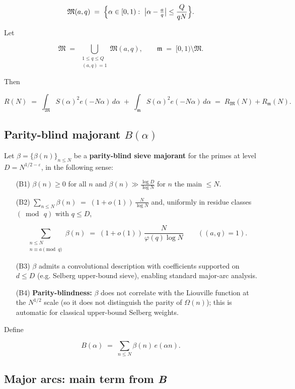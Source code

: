 \documentclass[11pt]{article}
\theoremstyle{definition}
\theoremstyle{remark}
\numberwithin{equation}{part}
\begin{document}
$$
	\mathfrak M(a,q)\;=\;\Bigl\{\alpha\in[0,1):\ \bigl|\alpha-\tfrac{a}{q}\bigr|
	\le \frac{Q}{qN}\Bigr\}.
$$

Let

$$
	\mathfrak M\;=\;\bigcup_{\substack{1\le q\le Q\\ (a,q)=1}}\mathfrak M(a,q),
	\qquad
	\mathfrak m\;=\;[0,1)\setminus\mathfrak M .
$$

Then

$$
	R(N)\;=\;\int_{\mathfrak M} S(\alpha)^2 e(-N\alpha)\,d\alpha\;+\;
	\int_{\mathfrak m} S(\alpha)^2 e(-N\alpha)\,d\alpha
	\;=\;R_{\mathfrak M}(N)+R_{\mathfrak m}(N).
$$


\subsection{Parity-blind majorant \texorpdfstring{$B(\alpha)$}{B\textalpha}}

Let $\beta=\{\beta(n)\}_{n\le N}$ be a \textbf{parity-blind sieve majorant} for the primes at level $D=N^{1/2-\varepsilon}$, in the following sense:

\begin{itemize}[leftmargin=*]
	\item[(B1)] $\beta(n)\ge 0$ for all $n$ and $\beta(n)\gg \tfrac{\log D}{\log N}$ for $n$ the main $\le N$.
	\item[(B2)] $\displaystyle \sum_{n\le N}\beta(n)\;=\;(1+o(1))\,\frac{N}{\log N}$ and, uniformly in residue classes $(\bmod\,q)$ with $q\le D$,

	      $$
		      \sum_{\substack{n\le N\\ n\equiv a\!\!\!\pmod q}}\beta(n)
		      \;=\;(1+o(1))\,\frac{N}{\varphi(q)\log N}\qquad ((a,q)=1).
	      $$

	\item[(B3)] $\beta$ admits a convolutional description with coefficients supported on $d\le D$ (e.g. Selberg upper-bound sieve), enabling standard major-arc analysis.
	\item[(B4)] \textbf{Parity-blindness:} $\beta$ does not correlate with the Liouville function at the $N^{1/2}$ scale (so it does not distinguish the parity of $\Omega(n)$); this is automatic for classical upper-bound Selberg weights.
\end{itemize}

Define

$$
	B(\alpha)\;=\;\sum_{n\le N}\beta(n)\,e(\alpha n).
$$


\subsection{Major arcs: main term from \textit{B}}
\end{document}
